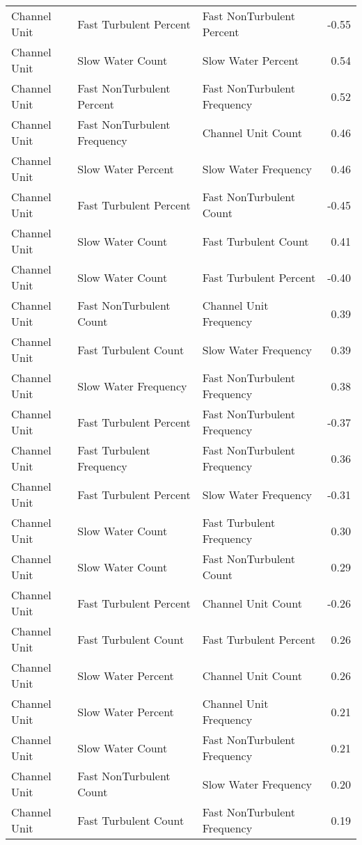 \documentclass[
  12pt,
]{article}
\begin{document}
\begin{longtable}[t]{>{\raggedright\arraybackslash}p{1in}>{\raggedright\arraybackslash}p{2in}>{\raggedright\arraybackslash}p{2in}r}
Channel Unit & Fast Turbulent Percent & Fast NonTurbulent Percent & -0.55\\
Channel Unit & Slow Water Count & Slow Water Percent & 0.54\\
Channel Unit & Fast NonTurbulent Percent & Fast NonTurbulent Frequency & 0.52\\
\addlinespace
Channel Unit & Fast NonTurbulent Frequency & Channel Unit Count & 0.46\\
Channel Unit & Slow Water Percent & Slow Water Frequency & 0.46\\
Channel Unit & Fast Turbulent Percent & Fast NonTurbulent Count & -0.45\\
Channel Unit & Slow Water Count & Fast Turbulent Count & 0.41\\
Channel Unit & Slow Water Count & Fast Turbulent Percent & -0.40\\
\addlinespace
Channel Unit & Fast NonTurbulent Count & Channel Unit Frequency & 0.39\\
Channel Unit & Fast Turbulent Count & Slow Water Frequency & 0.39\\
Channel Unit & Slow Water Frequency & Fast NonTurbulent Frequency & 0.38\\
Channel Unit & Fast Turbulent Percent & Fast NonTurbulent Frequency & -0.37\\
Channel Unit & Fast Turbulent Frequency & Fast NonTurbulent Frequency & 0.36\\
\addlinespace
Channel Unit & Fast Turbulent Percent & Slow Water Frequency & -0.31\\
Channel Unit & Slow Water Count & Fast Turbulent Frequency & 0.30\\
Channel Unit & Slow Water Count & Fast NonTurbulent Count & 0.29\\
Channel Unit & Fast Turbulent Percent & Channel Unit Count & -0.26\\
Channel Unit & Fast Turbulent Count & Fast Turbulent Percent & 0.26\\
\addlinespace
Channel Unit & Slow Water Percent & Channel Unit Count & 0.26\\
Channel Unit & Slow Water Percent & Channel Unit Frequency & 0.21\\
Channel Unit & Slow Water Count & Fast NonTurbulent Frequency & 0.21\\
Channel Unit & Fast NonTurbulent Count & Slow Water Frequency & 0.20\\
Channel Unit & Fast Turbulent Count & Fast NonTurbulent Frequency & 0.19\\

\end{longtable}
\end{document}
